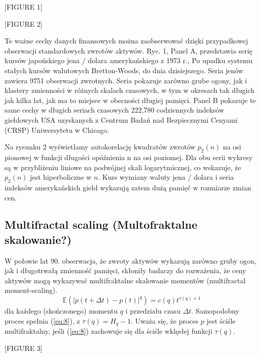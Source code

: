 \documentclass[12pt]{article}
\theoremstyle{definition}
\begin{document}
\begin{center}
[FIGURE 1]
\end{center}

\begin{center}
[FIGURE 2]
\end{center}

Te ważne cechy danych finansowych można zaobserwować dzięki przypadkowej obserwacji standardowych zwrotów aktywów. Ryc. 1, Panel A, przedstawia serię kursów japońskiego jena / dolara amerykańskiego z 1973 r., Po upadku systemu stałych kursów walutowych Bretton-Woods, do dnia dzisiejszego. Seria jenów zawiera 9751 obserwacji zwrotnych. Seria pokazuje zarówno grube ogony, jak i klastery zmienności w różnych skalach czasowych, w tym w okresach tak długich jak kilka lat, jak ma to miejsce w obecności długiej pamięci. Panel B pokazuje te same cechy w długich seriach czasowych 222,780 codziennych indeksów giełdowych USA uzyskanych z Centrum Badań nad Bezpiecznymi Cenyami (CRSP) Uniwersytetu w Chicago.

Na rysunku 2 wyświetlamy autokorelację kwadratów zwrotów $p_2(n)$ na osi pionowej w funkcji długości opóźnienia n na osi poziomej. Dla obu serii wykresy są w przybliżeniu liniowe na podwójnej skali logarytmicznej, co wskazuje, że $p_2(n)$ jest hiperboliczne w $n$. Kurs wymiany waluty jena / dolara i seria indeksów amerykańskich giełd wykazują zatem dużą pamięć w rozmiarze zmian cen.

\subsection{Multifractal scaling (Multofraktalne skalowanie?)}

W połowie lat 90. obserwacja, że zwroty aktywów wykazują zarówno gruby ogon, jak i długotrwałą zmienność pamięci, skłoniły badaczy do rozważenia, że ceny aktywów mogą wykazywać multifraktalne skalowanie momentów (multifractal moment-scaling).
\begin{equation}
\label{eq:8}
\mathbb{E}(|p(t+\Delta t) - p(t)|^q)=c(q) t^{\tau (q)+1}
\end{equation}
dla każdego (skończonego) momentu $q$ i przedziału czasu $\Delta t$. 
Samopodobny proces spełnia (\ref{eq:8}), z $\tau (q)=H_q-1$. Uważa się, że proces $p$ jest ściśle multifraktalny, jeśli (\ref{eq:8}) zachowuje się dla ściśle wklęsłej funkcji $\tau (q)$.

\begin{center}
[FIGURE 3]
\end{center}
\end{document}
